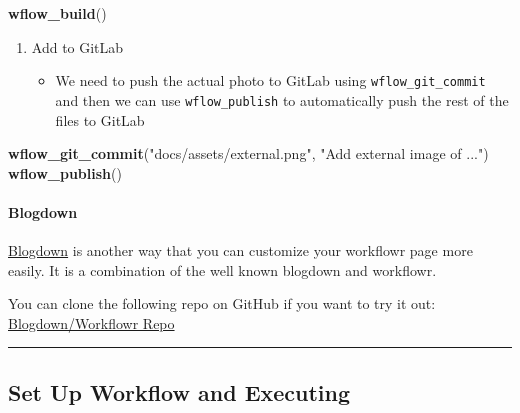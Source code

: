 \documentclass[openany]{article}
\newenvironment{Shaded}{\begin{snugshade}}{\end{snugshade}}
\newcommand{\KeywordTok}[1]{\textcolor[rgb]{0.13,0.29,0.53}{\textbf{#1}}}
\newcommand{\NormalTok}[1]{#1}
\newcommand{\StringTok}[1]{\textcolor[rgb]{0.31,0.60,0.02}{#1}}
\providecommand{\tightlist}{%
  \setlength{\itemsep}{0pt}\setlength{\parskip}{0pt}}
\let\oldparagraph\paragraph
\renewcommand{\paragraph}[1]{\oldparagraph{#1}\mbox{}}
\begin{document}
\begin{Shaded}
\begin{Highlighting}[]
\KeywordTok{wflow_build}\NormalTok{()}
\end{Highlighting}
\end{Shaded}

\begin{enumerate}
\def\labelenumi{\arabic{enumi}.}
\setcounter{enumi}{3}
\tightlist
\item
  Add to GitLab

  \begin{itemize}
  \tightlist
  \item
    We need to push the actual photo to GitLab using \texttt{wflow\_git\_commit} and then we can use \texttt{wflow\_publish} to automatically push the rest of the files to GitLab
  \end{itemize}
\end{enumerate}

\begin{Shaded}
\begin{Highlighting}[]
\KeywordTok{wflow_git_commit}\NormalTok{(}\StringTok{"docs/assets/external.png"}\NormalTok{, }
    \StringTok{"Add external image of ..."}\NormalTok{)}
\KeywordTok{wflow_publish}\NormalTok{()}
\end{Highlighting}
\end{Shaded}

\hypertarget{blogdown}{%
\paragraph{Blogdown}\label{blogdown}}

\href{https://bookdown.org/yihui/blogdown/a-quick-example.html}{Blogdown} is another way that you can customize your workflowr page more easily. It is a combination of the well known blogdown and workflowr.

You can clone the following repo on GitHub if you want to try it out: \href{https://github.com/docmanny/workflowr-blogdown-experiment}{Blogdown/Workflowr Repo}

\begin{center}\rule{0.5\linewidth}{\linethickness}\end{center}

\hypertarget{set-up-workflow-and-executing}{%
\subsection{Set Up Workflow and Executing}\label{set-up-workflow-and-executing}}
\end{document}
